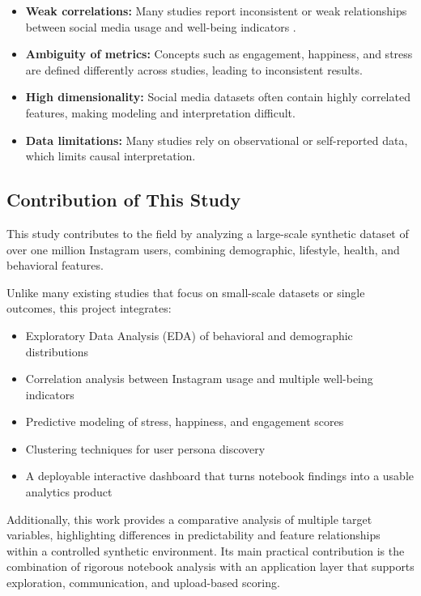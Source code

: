 \documentclass[12pt,a4paper]{article}
\begin{document}
\begin{itemize}
    \item \textbf{Weak correlations:} Many studies report inconsistent or weak relationships between social media usage and well-being indicators \cite{OrbenPrzybylski2019}.
    
    \item \textbf{Ambiguity of metrics:} Concepts such as engagement, happiness, and stress are defined differently across studies, leading to inconsistent results.
    
    \item \textbf{High dimensionality:} Social media datasets often contain highly correlated features, making modeling and interpretation difficult.
    
    \item \textbf{Data limitations:} Many studies rely on observational or self-reported data, which limits causal interpretation.
\end{itemize}

\subsection{Contribution of This Study}

This study contributes to the field by analyzing a large-scale synthetic dataset of over one million Instagram users, combining demographic, lifestyle, health, and behavioral features.

Unlike many existing studies that focus on small-scale datasets or single outcomes, this project integrates:
\begin{itemize}
    \item Exploratory Data Analysis (EDA) of behavioral and demographic distributions
    \item Correlation analysis between Instagram usage and multiple well-being indicators
    \item Predictive modeling of stress, happiness, and engagement scores
    \item Clustering techniques for user persona discovery
    \item A deployable interactive dashboard that turns notebook findings into a usable analytics product
\end{itemize}

Additionally, this work provides a comparative analysis of multiple target variables, highlighting differences in predictability and feature relationships within a controlled synthetic environment. Its main practical contribution is the combination of rigorous notebook analysis with an application layer that supports exploration, communication, and upload-based scoring.
\end{document}
